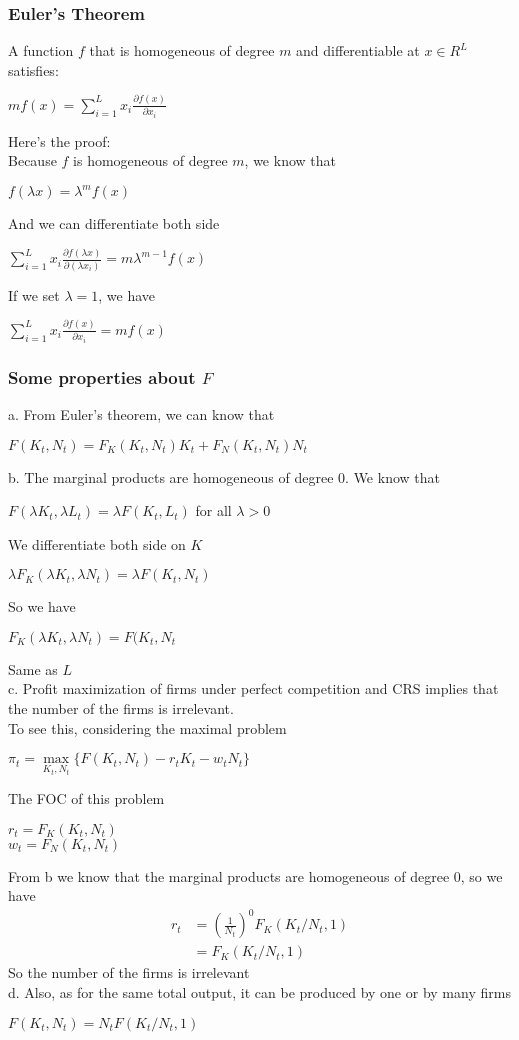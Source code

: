 \documentclass{article}
\begin{document}
\subsubsection{Euler's Theorem}
A function $f$ that is homogeneous of degree $m$ and differentiable at $x \in R^L$ satisfies:\\
\centerline{$mf(x) = \sum\limits^L_{i=1}x_i\frac{\partial f(x)}{\partial x_i}$}
Here's the proof:\\
Because $f$ is homogeneous of degree $m$, we know that\\
\centerline{$f(\lambda x) = \lambda^m f(x)$}
And we can differentiate both side\\
\centerline{$\sum\limits^L_{i=1}x_i \frac{\partial f(\lambda x)}{\partial (\lambda x_i)} = m\lambda^{m-1}f(x)$}
If we set $\lambda = 1$, we have\\
\centerline{$\sum\limits^L_{i=1}x_i \frac{\partial f(x)}{\partial x_i} = mf(x)$}

\subsubsection{Some properties about $F$}
a. From Euler's theorem, we can know that\\
\centerline{$F(K_t, N_t) = F_K(K_t, N_t)K_t + F_N(K_t, N_t)N_t$}
b. The marginal products are homogeneous of degree 0. We know that\\
\centerline{$F(\lambda K_t, \lambda L_t) = \lambda F(K_t, L_t)$ for all $\lambda > 0$}
We differentiate both side on $K$\\
\centerline{$\lambda F_K(\lambda K_t, \lambda N_t) = \lambda F(K_t, N_t)$}
So we have\\
\centerline{$F_K(\lambda K_t, \lambda N_t) = F(K_t, N_t$}
Same as $L$\\
c. Profit maximization of firms under perfect competition and CRS implies that the number of the firms is irrelevant.\\
To see this, considering the maximal problem\\
\centerline{$\pi_t = \mathop{max}\limits_{K_t, N_t}\{F(K_t, N_t) - r_tK_t - w_tN_t\}$}
The FOC of this problem
\begin{center}
	$r_t = F_K(K_t, N_t)$\\
	$w_t = F_N(K_t, N_t)$
\end{center}
From b we know that the marginal products are homogeneous of degree 0, so we have
\begin{align*}
	r_t &= (\frac{1}{N_t})^0 F_K(K_t/N_t, 1)\\
	&= F_K(K_t/N_t, 1)
\end{align*}
So the number of the firms is irrelevant\\
d. Also, as for the same total output, it can be produced by one or by many firms\\
\centerline{$F(K_t, N_t) = N_t F(K_t/N_t, 1)$}
\end{document}
